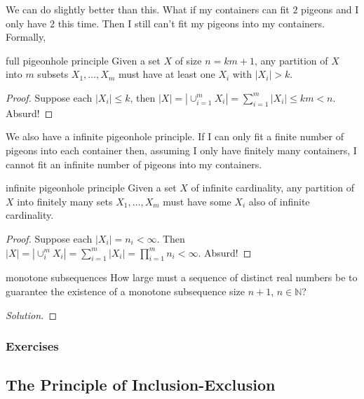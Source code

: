 \documentclass{article}
\begin{document}
We can do slightly better than this. What if my containers can fit $2$ pigeons and I only have $2$ this time. Then I still can't fit my pigeons 
into my containers. Formally, 

\begin{theorem}[]{full pigeonhole principle}
    Given a set $X$ of size $n = km+1$, any partition of $X$ into $m$ subsets $X_1, \dots, X_m$ must have at least one $X_i$ with $|X_i| > k$.
\end{theorem}

\begin{proof}
    Suppose each $|X_i| \leq k$, then $|X| = |\cup_{i=1}^m X_i| = \sum_{i=1}^m |X_i| \leq km < n$. Absurd!
\end{proof}

We also have a infinite pigeonhole principle. If I can only fit a finite number of pigeons into each container then, assuming I only have 
finitely many containers, I cannot fit an infinite number of pigeons into my containers.

\begin{theorem}[]{infinite pigeonhole principle}
    Given a set $X$ of infinite cardinality, any partition of $X$ into finitely many sets $X_1, \dots, X_m$ must have some $X_i$ also of infinite 
    cardinality. 
\end{theorem}

\begin{proof}
    Suppose each $|X_i| = n_i < \infty$. Then $|X| = |\cup_{i}^m X_i| = \sum_{i=1}^m |X_i| 
    = \prod_{i=1}^m n_i < \infty$. Absurd!
\end{proof}

\begin{problem}[]{monotone subsequences}
    How large must a sequence of distinct real numbers be to guarantee the existence of a monotone subsequence 
    size $n + 1$, $n \in \mathbb{N}$? 
\end{problem}

\begin{proof}[Solution]

\end{proof}

\subsubsection*{Exercises}

\newpage

\subsection{The Principle of Inclusion-Exclusion}
\end{document}
